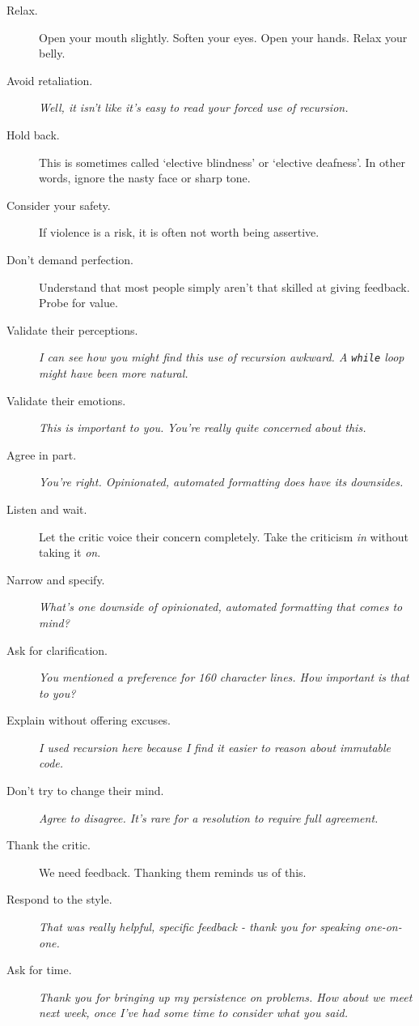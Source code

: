 \documentclass{article}
\begin{document}
\begin{tiny}
\begin{multicols}{3}
\begin{tcolorbox}
        \begin{description}
            \item[Relax.] Open your mouth slightly. Soften your eyes. Open your hands. Relax your belly.
            \item[Avoid retaliation.] \emph {Well, it isn't like it's easy to read your forced use of recursion.}
            \item[Hold back.] This is sometimes called `elective blindness' or `elective deafness'. In other words, ignore the nasty face or sharp tone.
            \item[Consider your safety.] If violence is a risk, it is often not worth being assertive.
            \item[Don't demand perfection.] Understand that most people simply aren't that skilled at giving feedback. Probe for value.
            \item[Validate their perceptions.] \emph{I can see how you might find this use of recursion awkward. A \texttt{while} loop might have been more natural.}
            \item[Validate their emotions.] \emph{This is important to you.} \emph{You're really quite concerned about this.}
            \item[Agree in part.] \emph{You're right. Opinionated, automated formatting does have its downsides.}
            \item[Listen and wait.] Let the critic voice their concern completely. Take the criticism \emph{in} without taking it \emph{on}.
            \item[Narrow and specify.] \emph{What's one downside of opinionated, automated formatting that comes to mind?}
            \item[Ask for clarification.] \emph{You mentioned a preference for 160 character lines. How important is that to you?}
            \item[Explain without offering excuses.] \emph{I used recursion here because I find it easier to reason about immutable code.}
            \item[Don't try to change their mind.] \emph{Agree to disagree. It's rare for a resolution to require full agreement.}
            \item[Thank the critic.] We need feedback. Thanking them reminds us of this.
            \item[Respond to the style.] \emph{That was really helpful, specific feedback - thank you for speaking one-on-one.}
            \item[Ask for time.] \emph{Thank you for bringing up my persistence on problems. How about we meet next week, once I've had some time to consider what you said.}

\end{description}
\end{tcolorbox}
\end{multicols}
\end{tiny}
\end{document}
